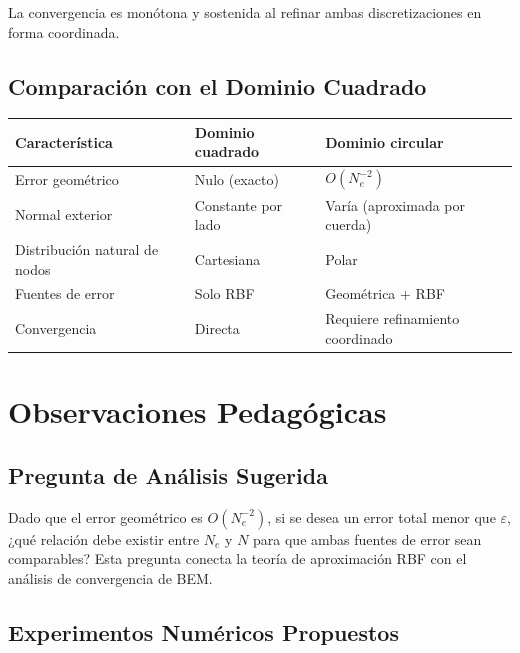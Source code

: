 \documentclass[12pt,a4paper]{article}
\begin{document}
La convergencia es monótona y sostenida al refinar ambas discretizaciones
en forma coordinada.

\subsection{Comparación con el Dominio Cuadrado}

\begin{center}
\begin{tabular}{lll}
\toprule
Característica & Dominio cuadrado & Dominio circular \\
\midrule
Error geométrico & Nulo (exacto) & $O(N_e^{-2})$ \\
Normal exterior & Constante por lado & Varía (aproximada por cuerda) \\
Distribución natural de nodos & Cartesiana & Polar \\
Fuentes de error & Solo RBF & Geométrica + RBF \\
Convergencia & Directa & Requiere refinamiento coordinado \\
\bottomrule
\end{tabular}
\end{center}

\section{Observaciones Pedagógicas}

\subsection{Pregunta de Análisis Sugerida}

Dado que el error geométrico es $O(N_e^{-2})$, si se desea un error total
menor que $\varepsilon$, ¿qué relación debe existir entre $N_e$ y $N$ para
que ambas fuentes de error sean comparables? Esta pregunta conecta la
teoría de aproximación RBF con el análisis de convergencia de BEM.

\subsection{Experimentos Numéricos Propuestos}
\end{document}
